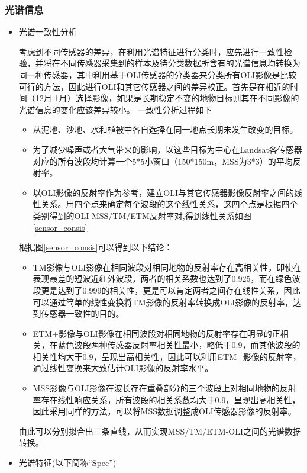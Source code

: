 \documentclass[supercite]{upcthesis}
\begin{document}
\subsubsection{光谱信息}
\begin{itemize}
\item 光谱一致性分析\cite{Han2015Four}

考虑到不同传感器的差异，在利用光谱特征进行分类时，应先进行一致性检验，并将在不同传感器采集到的样本及待分类数据所含有的光谱信息均转换为同一种传感器，其中利用基于OLI传感器的分类器来分类所有OLI影像是比较可行的方法，因此进行OLI和其它传感器之间的差异校正。首先是在相近的时间（12月-1月）选择影像，如果是长期稳定不变的地物目标则其在不同影像的光谱信息的变化应该差异较小。
一致性分析过程如下
\begin{itemize}
\item[-] 从泥地、沙地、水和植被中各自选择在同一地点长期未发生改变的目标。
\item[-] 为了减少噪声或者大气带来的影响，以这些目标为中心在Landsat各传感器对应的所有波段均计算一个5*5小窗口（150*150m，MSS为3*3）的平均反射率。
\item[-] 以OLI影像的反射率作为参考，建立OLI与其它传感器影像反射率之间的线性关系。用四个点来确定每个波段的这个线性关系，这四个点是根据四个类别得到的OLI-MSS/TM/ETM反射率对,得到线性关系如图\ref{sensor_consis}
\begin{figure*}
	\centering
	\caption{光谱一致性结果}
	\label{sensor_consis}
\end{figure*}
\end{itemize}
根据图\ref{sensor_consis}可以得到以下结论：
\begin{itemize}
\item [*] TM影像与OLI影像在相同波段对相同地物的反射率存在高相关性，即使在表现最差的短波近红外波段，两者的相关系数也达到了0.925，而在绿色波段更是达到了0.999的相关性，更是可以肯定两者之间存在线性关系，因此可以通过简单的线性变换将TM影像的反射率转换成OLI影像的反射率，达到传感器一致性的目的。
\item [*] ETM+影像与OLI影像在相同波段对相同地物的反射率存在明显的正相关，在蓝色波段两种传感器反射率相关性最小，略低于0.9，而其他波段的相关性均大于0.9，呈现出高相关性，因此可以利用ETM+影像的反射率，通过线性变换来大致估计OLI影像的反射率水平。
\item [*] MSS影像与OLI影像在波长存在重叠部分的三个波段上对相同地物的反射率存在线性响应关系，所有波段的相关系数均大于0.9，呈现出高相关性，因此采用同样的方法，可以将MSS数据调整成OLI传感器影像的反射率。
\end{itemize}
由此可以分别拟合出三条直线，从而实现MSS/TM/ETM-OLI之间的光谱数据转换。
\item 光谱特征(以下简称“Spec”)


\end{itemize}
\end{document}
